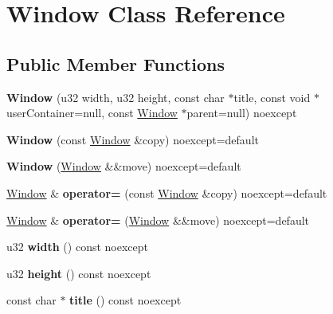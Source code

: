 \hypertarget{class_window}{}\section{Window Class Reference}
\label{class_window}
\subsection*{Public Member Functions}
\begin{DoxyCompactItemize}
\item 
\mbox{\label{class_window_a517728afaacf4c1b4af19d6ff35bed07}} 
{\bfseries Window} (u32 width, u32 height, const char $\ast$title, const void $\ast$user\+Container=null, const \mbox{\hyperlink{class_window}{Window}} $\ast$parent=null) noexcept
\item 
\mbox{\label{class_window_ab4bf82a7032223e2f4a0c9033706826b}} 
{\bfseries Window} (const \mbox{\hyperlink{class_window}{Window}} \&copy) noexcept=default
\item 
\mbox{\label{class_window_a613fe045b96f047ddbc1d991b4cde3a1}} 
{\bfseries Window} (\mbox{\hyperlink{class_window}{Window}} \&\&move) noexcept=default
\item 
\mbox{\label{class_window_adaebd07a572a8ba724c13fc1a2be65cb}} 
\mbox{\hyperlink{class_window}{Window}} \& {\bfseries operator=} (const \mbox{\hyperlink{class_window}{Window}} \&copy) noexcept=default
\item 
\mbox{\label{class_window_a454743cc24e4a428c9d28f4239876436}} 
\mbox{\hyperlink{class_window}{Window}} \& {\bfseries operator=} (\mbox{\hyperlink{class_window}{Window}} \&\&move) noexcept=default
\item 
\mbox{\label{class_window_afea4ec230d612e5fff3e8c72c227103d}} 
u32 {\bfseries width} () const noexcept
\item 
\mbox{\label{class_window_a1dbe3a32ba7758aa5469835f6a755680}} 
u32 {\bfseries height} () const noexcept
\item 
\mbox{\label{class_window_abeb6f33970a14509a124ffad71aecf39}} 
const char $\ast$ {\bfseries title} () const noexcept

\end{DoxyCompactItemize}
